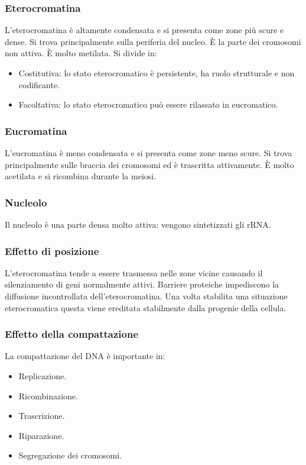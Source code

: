		\subsubsection{Eterocromatina}
		L'eterocromatina \`e altamente condensata e si presenta come zone pi\`u scure e dense.
		Si trova principalmente sulla periferia del nucleo. 
		\`E la parte dei cromosomi non attiva.
		\`E molto metilata.
		Si divide in:
		\begin{multicols}{2}
			\begin{itemize}
				\item Costitutiva: lo stato eterocromatico \`e persistente, ha ruolo strutturale e non codificante.
				\item Facoltativa: lo stato eterocromatico pu\`o essere rilassato in eucromatico.
			\end{itemize}
		\end{multicols}

		\subsubsection{Eucromatina}
		L'eucromatina \`e meno condensata e si presenta come zone meno scure.
		Si trova principalmente sulle braccia dei cromosomi ed \`e trascritta attivamente.
		\`E molto acetilata e si ricombina durante la meiosi.

		\subsubsection{Nucleolo}
		Il nucleolo \`e una parte densa molto attiva: vengono sintetizzati gli rRNA.

		\subsubsection{Effetto di posizione}
		L'eterocromatina tende a essere trasmessa nelle zone vicine causando il silenziamento di geni normalmente attivi.
		Barriere proteiche impediscono la diffusione incontrollata dell'eterocromatina.
		Una volta stabilita una situazione eterocromatica questa viene ereditata stabilmente dalla progenie della cellula.

		\subsubsection{Effetto della compattazione}
		La compattazione del DNA \`e importante in:
		\begin{multicols}{3}
			\begin{itemize}
				\item Replicazione.
				\item Ricombinazione.
				\item Trascrizione.
				\item Riparazione.
				\item Segregazione dei cromosomi.
			\end{itemize}
		\end{multicols}

